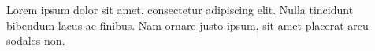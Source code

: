 Lorem ipsum dolor sit amet, consectetur adipiscing elit. Nulla tincidunt bibendum lacus ac finibus. Nam ornare justo ipsum, sit amet placerat arcu sodales non.